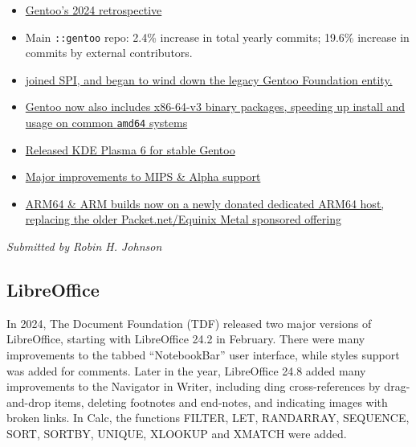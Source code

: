 \documentclass[a4paper]{report}
\begin{document}
\begin{itemize}

\item \href{https://www.gentoo.org/news/2025/01/05/new-year.html}{Gentoo's 2024 retrospective}

\item Main {\tt ::gentoo} repo: 2.4\% increase in total yearly commits; 19.6\% increase in commits by external contributors.

\item \href{https://www.gentoo.org/news/2024/04/10/SPI-associated-project.html}{joined SPI, and began to wind down the legacy Gentoo Foundation entity.}

\item \href{https://www.gentoo.org/news/2024/02/04/x86-64-v3.html}{Gentoo now also includes x86-64-v3 binary packages, speeding up install and usage on common {\tt amd64} systems}

\item \href{https://www.gentoo.org/news/2024/08/31/KDE-Plasma-6-upgrade.html}{Released KDE Plasma 6 for stable Gentoo}

\item \href{https://www.gentoo.org/news/2024/09/11/Improved-MIPS-and-Alpha-support.html}{Major improvements to MIPS \& Alpha support}

\item \href{https://www.gentoo.org/news/2024/10/07/Arm-Ltd-provides-server.html}{ARM64 \& ARM builds now on a newly donated dedicated ARM64 host, replacing the older Packet.net/Equinix Metal sponsored offering}

\end{itemize}

{\em Submitted by Robin H. Johnson}

\subsection{LibreOffice}

In 2024, The Document Foundation (TDF) released two major versions of LibreOffice, starting with LibreOffice 24.2 in February. There were many improvements to the tabbed “NotebookBar” user interface, while styles support was added for comments. Later in the year, LibreOffice 24.8 added many improvements to the Navigator in Writer, including ding cross-references by drag-and-drop items, deleting footnotes and end-notes, and indicating images with broken links. In Calc, the functions FILTER, LET, RANDARRAY, SEQUENCE, SORT, SORTBY, UNIQUE, XLOOKUP and XMATCH were added.
\end{document}
